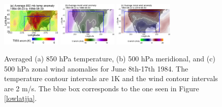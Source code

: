 \documentclass[smallextended]{svjour3}       %
\numberwithin{equation}{section}
\begin{document}
\begin{figure}
\centering
\includegraphics[width=0.25\textwidth]{fig11a}
\includegraphics[width=0.25\textwidth]{fig11b}
\includegraphics[width=0.25\textwidth]{fig11c}
\caption{Averaged (a) 850 hPa temperature, (b) 500 hPa meridional, and (c) 500 hPa zonal wind anomalies for June 8th-17th 1984. The temperature contour intervals are 1K and the wind contour intervals are 2 m/s. The blue box corresponds to the one seen in Figure \ref{lowlatjja}.}\label{avgjja}
\end{figure} 
\end{document}

